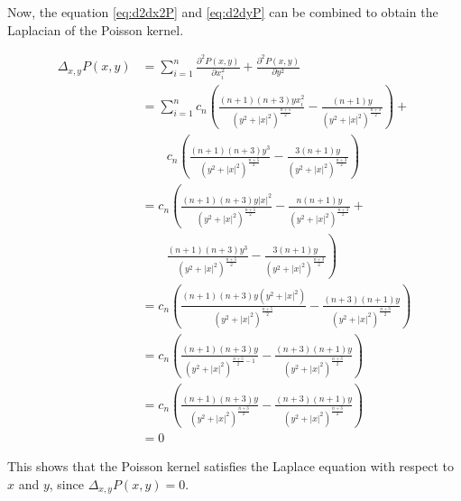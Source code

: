 \noindent Now, the equation \ref{eq:d2dx2P} and \ref{eq:d2dyP} can be combined to obtain the Laplacian of the Poisson kernel.

\begin{align*}
    \Delta_{x,y} P(x,y)&=\sum_{i=1}^n\frac{\partial^2P(x,y)}{\partial x_i^2}+\frac{\partial^2P(x,y)}{\partial y^2} \\
    &=\sum_{i=1}^nc_n\left(\frac{(n+1)(n+3)yx_i^2}{(y^2+|x|^2)^{\frac{n+5}{2}}}-\frac{(n+1)y}{(y^2+|x|^2)^{\frac{n+3}{2}}} \right)+ \\
    &\quad\quad c_n\left(\frac{(n+1)(n+3)y^3}{(y^2+|x|^2)^{\frac{n+5}{2}}}-\frac{3(n+1)y}{(y^2+|x|^2)^{\frac{n+3}{2}}} \right) \\
    &=c_n\left(\frac{(n+1)(n+3)y|x|^2}{(y^2+|x|^2)^{\frac{n+5}{2}}}-\frac{n(n+1)y}{(y^2+|x|^2)^{\frac{n+3}{2}}} \right.+\\
    &\quad\quad \left. \frac{(n+1)(n+3)y^3}{(y^2+|x|^2)^{\frac{n+5}{2}}}-\frac{3(n+1)y}{(y^2+|x|^2)^{\frac{n+3}{2}}} \right) \\
    &=c_n\left(\frac{(n+1)(n+3)y(y^2+|x|^2)}{(y^2+|x|^2)^{\frac{n+5}{2}}}-\frac{(n+3)(n+1)y}{(y^2+|x|^2)^{\frac{n+3}{2}}} \right) \\
    &=c_n\left(\frac{(n+1)(n+3)y}{(y^2+|x|^2)^{\frac{n+5}{2}-1}}-\frac{(n+3)(n+1)y}{(y^2+|x|^2)^{\frac{n+3}{2}}} \right) \\
    &=c_n\left(\frac{(n+1)(n+3)y}{(y^2+|x|^2)^{\frac{n+3}{2}}}-\frac{(n+3)(n+1)y}{(y^2+|x|^2)^{\frac{n+3}{2}}} \right) \\
    &=0
\end{align*}

This shows that the Poisson kernel satisfies the Laplace equation with respect to $x$ and $y$, since $\Delta_{x,y}P(x,y)=0$.